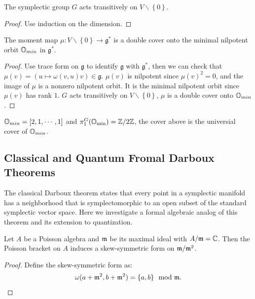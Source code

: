 \documentclass[12pt]{amsart}
\numberwithin{equation}{section}
\newcommand{\fg}{\mathfrak{g}} \newcommand{\fh}{\mathfrak{h}} \newcommand{\fk}{\mathfrak{k}}
\newcommand{\sqbra}[1]{\left[#1\right]}
\newcommand{\Bra}[1]{\left\{#1\right\}}
\begin{document}
\begin{lem}
  The symplectic group $G$ acts transitively on $V \backslash \Bra{0}$.
\end{lem}

\begin{proof}
  Use induction on the dimension.
\end{proof}


\begin{prop}
  The moment map $\mu: V \backslash \Bra{0} \to \fg^*$ is a double cover onto the minimal nilpotent orbit ${\mathbb {O}}_{min}$ in $\fg^*$.
\end{prop}

\begin{proof}
  Use trace form on $\fg$ to identify $\fg$ with $\fg^*$, then we can check that $\mu(v) = (u \mapsto \omega(v,u)v) \in \fg$.
  $\mu(v)$ is nilpotent since $\mu(v)^2 = 0$, and the image of $\mu$ is a nonzero nilpotent orbit. It is the minimal nilpotent orbit since $\mu(v)$ has rank $1$. $G$ acts transitively on $V \backslash \Bra{0}$, $\mu$ is a double cover onto ${\mathbb {O}}_{min}$.
\end{proof}

\begin{rk}
  $\BO_{min} = \sqbra{2,1, \cdots,1}$ and $\pi_{1}^{G}({\mathbb {O}}_{\min}) = {\mathbb {Z}}/2{\mathbb {Z}}$, the cover above is the universial cover of ${\mathbb {O}}_{min}$.
\end{rk}



\subsection{Classical and Quantum Fromal Darboux Theorems}

The classical Darboux theorem states that every point in a symplectic manifold has a neighborhood that is symplectomorphic to an open subset of the standard symplectic vector space. Here we investigate a formal algebraic analog of this theorem and its extension to quantization.

\begin{lem}
  Let $A$ be a Poisson algebra and $\mathfrak{m}$ be its maximal ideal with $A/\mathfrak{m} = {\mathbb {C}}$. Then the Poisson bracket on $A$ induces a skew-symmetric form on $\mathfrak{m}/\mathfrak{m}^2$.
\end{lem}

\begin{proof}
  Define the skew-symmetric form as:
  \[
    \omega(a + \mathfrak{m}^2, b + \mathfrak{m}^2) = \{a,b\} \mod {\mathfrak{m}}.
  \]
\end{proof}
\end{document}
